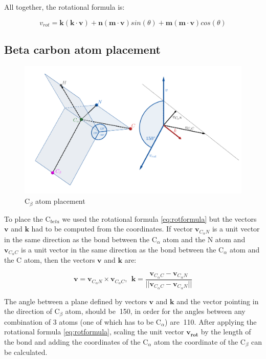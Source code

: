 All together, the rotational formula is:

\begin{equation}
    v_{rot} = \bm{k}(\bm{k} \cdot \bm{v}) + \bm{n} (\bm{m} \cdot \bm{v}) sin(\theta) + \bm{m} (\bm{m} \cdot \bm{v}) cos(\theta)
    \label{eq:rotformula}
\end{equation}

\subsection{Beta carbon atom placement}

\begin{figure}
    \centering
    \includegraphics[width=\linewidth]{imgs_tomas/cbeta.png}
    \caption{C$_\beta$ atom placement}
    \label{fig:cbeta}
\end{figure}

To place the C$_{beta}$ we used the rotational formula \ref{eq:rotformula} but the vectors $\bm{v}$ and $\bm{k}$ had to be computed from the coordinates. If vector $\bm{v}_{C_\alpha N}$ is a unit vector in the same direction as the bond between the C$_\alpha$ atom and the N atom and $\bm{v}_{C_\alpha C}$ is a unit vector in the same direction as the bond between the C$_\alpha$ atom and the C atom, then the vectors $\bm{v}$ and $\bm{k}$ are:

$$\bm{v} = \bm{v}_{C_\alpha N} \times  \bm{v}_{C_\alpha C}, ~~ \bm{k} = \frac{\bm{v}_{C_\alpha C} -  \bm{v}_{C_\alpha N}}{||\bm{v}_{C_\alpha C} -  \bm{v}_{C_\alpha N}||}$$

The angle between a plane defined by vectors $\bm{v}$ and $\bm{k}$ and the vector pointing in the direction of C$_\beta$ atom, should be $~$150\degree, in order for the angles between any combination of 3 atoms (one of which has to be C$_\alpha$) are $~$110\degree.
After applying the rotational formula \ref{eq:rotformula}, scaling the unit vector $\bm{v_{rot}}$ by the length of the bond and adding the coordinates of the C$_\alpha$ atom the coordinate of the C$_\beta$ can be calculated.

